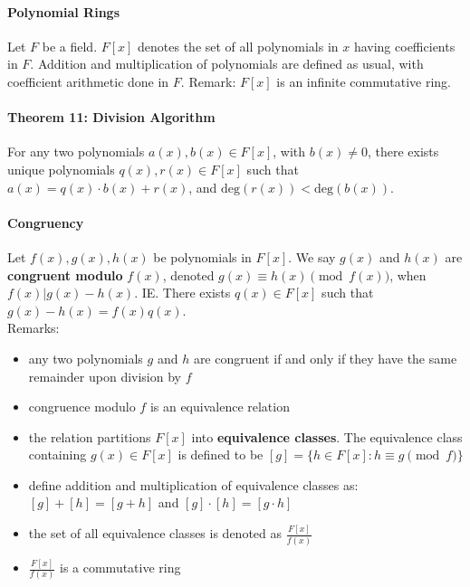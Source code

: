 \documentclass[10pt,letter]{article}
\theoremstyle{plain}
\theoremstyle{definition}
\begin{document}
\paragraph{Polynomial Rings}
Let $F$ be a field. $F[x]$ denotes the set of all polynomials in $x$ having coefficients in $F$. Addition and multiplication of polynomials are defined as usual, with coefficient arithmetic done in $F$. Remark: $F[x]$ is an infinite commutative ring.

\paragraph{Theorem 11: Division Algorithm}
For any two polynomials $a(x),b(x)\in F[x]$, with $b(x)\neq0$, there exists unique polynomials $q(x),r(x)\in F[x]$ such that $a(x)=q(x)\cdot b(x)+r(x)$, and $\text{deg}(r(x))<\text{deg}(b(x))$. \\ 


\paragraph{Congruency}
Let $f(x),g(x),h(x)$ be polynomials in $F[x]$. We say $g(x)$ and $h(x)$  are \textbf{congruent modulo} $f(x)$, denoted $g(x)\equiv h(x)\pmod{f(x)}$, when $f(x)|g(x)-h(x)$. IE. There exists $q(x)\in F[x]$ such that $g(x)-h(x)=f(x)q(x)$. \\ 
Remarks: 
\begin{itemize}
    \item any two polynomials $g$ and $h$ are congruent if and only if they have the same remainder upon division by $f$ 
    \item congruence modulo $f$ is an equivalence relation 
    \item the relation partitions $F[x]$ into \textbf{equivalence classes}. The equivalence class containing $g(x)\in F[x]$ is defined to be $[g]=\{h\in F[x]:h\equiv g\pmod{f}\}$ 
    \item define addition and multiplication of equivalence classes as: $[g]+[h]=[g+h]$ and $[g]\cdot[h]=[g\cdot h]$ 
    \item the set of all equivalence classes is denoted as $\frac{F[x]}{f(x)}$ 
    \item $\frac{F[x]}{f(x)}$ is a commutative ring
\end{itemize}
\end{document}
